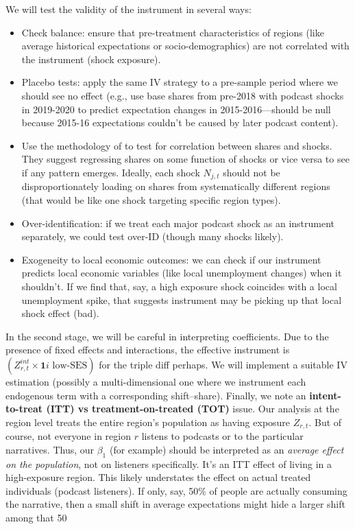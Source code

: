 \documentclass[12pt]{article}
\begin{document}
We will test the validity of the instrument in several ways: \begin{itemize} \item Check balance: ensure that pre-treatment characteristics of regions (like average historical expectations or socio-demographics) are not correlated with the instrument (shock exposure). \item Placebo tests: apply the same IV strategy to a pre-sample period where we should see no effect (e.g., use base shares from pre-2018 with podcast shocks in 2019-2020 to predict expectation changes in 2015-2016—should be null because 2015-16 expectations couldn't be caused by later podcast content). \item Use the methodology of \citet{Adao2019} to test for correlation between shares and shocks. They suggest regressing shares on some function of shocks or vice versa to see if any pattern emerges. Ideally, each shock $N_{j,t}$ should not be disproportionately loading on shares from systematically different regions (that would be like one shock targeting specific region types). \item Over-identification: if we treat each major podcast shock as an instrument separately, we could test over-ID (though many shocks likely). \item Exogeneity to local economic outcomes: we can check if our instrument predicts local economic variables (like local unemployment changes) when it shouldn't. If we find that, say, a high exposure shock coincides with a local unemployment spike, that suggests instrument may be picking up that local shock effect (bad). \end{itemize}
In the second stage, we will be careful in interpreting coefficients. Due to the presence of fixed effects and interactions, the effective instrument is $\left(Z^{int}_{r,t} \times \mathbf{1}{i\text{ low-SES}}\right)$ for the triple diff perhaps. We will implement a suitable IV estimation (possibly a multi-dimensional one where we instrument each endogenous term with a corresponding shift–share).
Finally, we note an \textbf{intent-to-treat (ITT) vs treatment-on-treated (TOT)} issue. Our analysis at the region level treats the entire region's population as having exposure $Z_{r,t}$. But of course, not everyone in region $r$ listens to podcasts or to the particular narratives. Thus, our $\beta_1$ (for example) should be interpreted as an \emph{average effect on the population}, not on listeners specifically. It's an ITT effect of living in a high-exposure region. This likely understates the effect on actual treated individuals (podcast listeners). If only, say, 50\% of people are actually consuming the narrative, then a small shift in average expectations might hide a larger shift among that 50%
\end{document}
